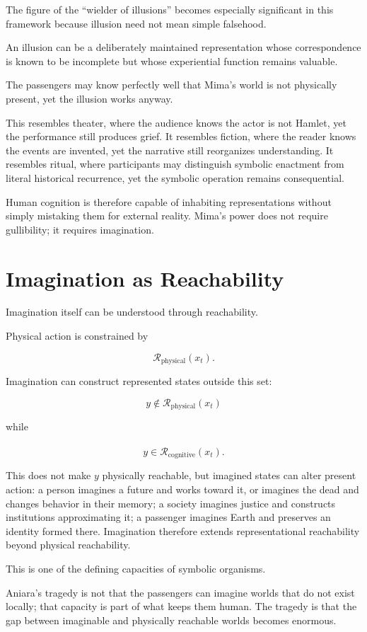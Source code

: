 \documentclass[11pt,oneside]{book}
\theoremstyle{definition}
\theoremstyle{remark}
\newcommand{\R}{\mathcal{R}}
\begin{document}
The figure of the ``wielder of illusions'' becomes especially significant in this framework because illusion need not mean simple falsehood.

An illusion can be a deliberately maintained representation whose correspondence is known to be incomplete but whose experiential function remains valuable.

The passengers may know perfectly well that Mima's world is not physically present, yet the illusion works anyway.

This resembles theater, where the audience knows the actor is not Hamlet, yet the performance still produces grief. It resembles fiction, where the reader knows the events are invented, yet the narrative still reorganizes understanding. It resembles ritual, where participants may distinguish symbolic enactment from literal historical recurrence, yet the symbolic operation remains consequential.

Human cognition is therefore capable of inhabiting representations without simply mistaking them for external reality. Mima's power does not require gullibility; it requires imagination.

\section{Imagination as Reachability}

Imagination itself can be understood through reachability.

Physical action is constrained by

\[
\R_{\mathrm{physical}}(x_t).
\]

Imagination can construct represented states outside this set:

\[
y\notin\R_{\mathrm{physical}}(x_t)
\]

while

\[
y\in\widehat{\R}_{\mathrm{cognitive}}(x_t).
\]

This does not make \(y\) physically reachable, but imagined states can alter present action: a person imagines a future and works toward it, or imagines the dead and changes behavior in their memory; a society imagines justice and constructs institutions approximating it; a passenger imagines Earth and preserves an identity formed there. Imagination therefore extends representational reachability beyond physical reachability.

This is one of the defining capacities of symbolic organisms.

Aniara's tragedy is not that the passengers can imagine worlds that do not exist locally; that capacity is part of what keeps them human. The tragedy is that the gap between imaginable and physically reachable worlds becomes enormous.
\end{document}
